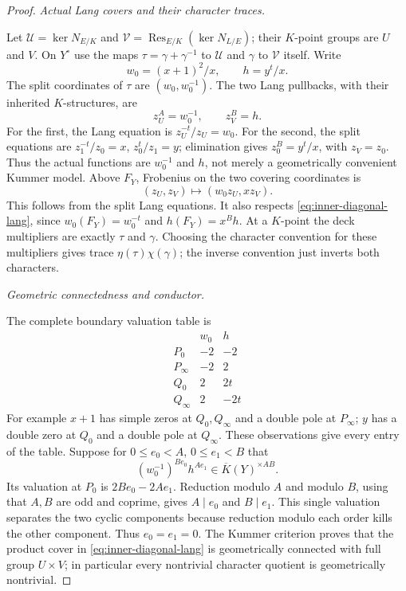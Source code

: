 \documentclass[11pt]{article}
\begin{document}
\begin{proof}
\smallskip\noindent\textit{Actual Lang covers and their character traces.}\par
Let $\mathcal U=\ker N_{E/K}$ and
$\mathcal V=\operatorname{Res}_{E/K}(\ker N_{L/E})$;
their $K$-point groups are $U$ and $V$. On $Y^\circ$ use the
maps $\tau=\gamma+\gamma^{-1}$ to $\mathcal U$ and $\gamma$
to $\mathcal V$ itself. Write
\[
 w_0=(x+1)^2/x,\qquad h=y^t/x.
\]
The split coordinates of $\tau$ are $(w_0,w_0^{-1})$.
The two Lang pullbacks, with their inherited $K$-structures, are
\begin{equation}\label{eq:inner-diagonal-lang}
 z_U^A=w_0^{-1},\qquad z_V^B=h.
\end{equation}
For the first, the Lang equation is $z_U^{-t}/z_U=w_0$.
For the second, the split equations are
$z_1^{-t}/z_0=x$, $z_0^t/z_1=y$; elimination gives
$z_0^B=y^t/x$, with $z_V=z_0$.
Thus the actual functions are $w_0^{-1}$ and $h$, not merely
a geometrically convenient Kummer model.
Above $F_Y$, Frobenius on the two covering coordinates is
\[
 (z_U,z_V)\longmapsto(w_0z_U,xz_V).
\]
This follows from the split Lang equations. It also respects
\eqref{eq:inner-diagonal-lang}, since
$w_0(F_Y)=w_0^{-t}$ and $h(F_Y)=x^Bh$.
At a $K$-point the deck multipliers are exactly
$\tau$ and $\gamma$. Choosing the character convention for
these multipliers gives trace $\eta(\tau)\chi(\gamma)$;
the inverse convention just inverts both characters.

\smallskip\noindent\textit{Geometric connectedness and conductor.}\par
The complete boundary valuation table is
\begin{equation}\label{eq:inner-diagonal-valuations}
\begin{array}{c|rr}
 &w_0&h\\\hline
 P_0&-2&-2\\
 P_\infty&-2&2\\
 Q_0&2&2t\\
 Q_\infty&2&-2t
\end{array}
\end{equation}
For example $x+1$ has simple zeros at $Q_0,Q_\infty$ and
a double pole at $P_\infty$; $y$ has a double zero at $Q_0$
and a double pole at $Q_\infty$. These observations give every
entry of the table.
Suppose for $0\le e_0<A$, $0\le e_1<B$ that
\[
 (w_0^{-1})^{Be_0}h^{Ae_1}
       \in\overline K(Y)^{\times AB}.
\]
Its valuation at $P_0$ is $2Be_0-2Ae_1$.
Reduction modulo $A$ and modulo $B$, using that $A,B$ are
odd and coprime, gives $A\mid e_0$ and $B\mid e_1$.
This single valuation separates the two cyclic components
because reduction modulo each order kills the other component.
Thus $e_0=e_1=0$. The Kummer criterion proves that the
product cover in \eqref{eq:inner-diagonal-lang} is geometrically
connected with full group $U\times V$; in particular every
nontrivial character quotient is geometrically nontrivial.


\end{proof}
\end{document}
